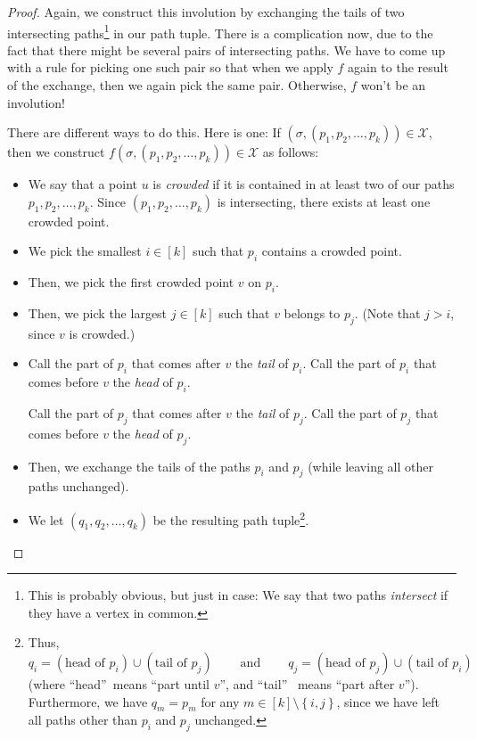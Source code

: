 \begin{definition}
\begin{proof}
Again, we construct this involution by exchanging the tails of two
intersecting paths\footnote{This is probably obvious, but just in case: We say
that two paths \emph{intersect} if they have a vertex in common.} in our path
tuple. There is a complication now, due to the fact that there might be
several pairs of intersecting paths. We have to come up with a rule for
picking one such pair so that when we apply $f$ again to the result of the
exchange, then we again pick the same pair. Otherwise, $f$ won't be an involution!

There are different ways to do this. Here is one: If $\left(  \sigma,\left(
p_{1},p_{2},\ldots,p_{k}\right)  \right)  \in\mathcal{X}$, then we construct
$f\left(  \sigma,\left(  p_{1},p_{2},\ldots,p_{k}\right)  \right)
\in\mathcal{X}$ as follows:

\begin{itemize}
\item We say that a point $u$ is \emph{crowded} if it is contained in at least
two of our paths $p_{1},p_{2},\ldots,p_{k}$. Since $\left(  p_{1},p_{2}%
,\ldots,p_{k}\right)  $ is intersecting, there exists at least one crowded point.

\item We pick the smallest $i\in\left[  k\right]  $ such that $p_{i}$ contains
a crowded point.

\item Then, we pick the first crowded point $v$ on $p_{i}$.

\item Then, we pick the largest $j\in\left[  k\right]  $ such that $v$ belongs
to $p_{j}$. (Note that $j>i$, since $v$ is crowded.)

\item Call the part of $p_{i}$ that comes after $v$ the \emph{tail} of $p_{i}%
$. Call the part of $p_{i}$ that comes before $v$ the \emph{head}\textbf{ }of
$p_{i}$.

Call the part of $p_{j}$ that comes after $v$ the \emph{tail} of $p_{j}$. Call
the part of $p_{j}$ that comes before $v$ the \emph{head}\textbf{ }of $p_{j}$.

\item Then, we exchange the tails of the paths $p_{i}$ and $p_{j}$ (while
leaving all other paths unchanged).

\item We let $\left(  q_{1},q_{2},\ldots,q_{k}\right)  $ be the resulting path
tuple\footnote{Thus,%
\[
q_{i}=\left(  \text{head of }p_{i}\right)  \cup\left(  \text{tail of }%
p_{j}\right)  \ \ \ \ \ \ \ \ \ \ \text{and}\ \ \ \ \ \ \ \ \ \ q_{j}=\left(
\text{head of }p_{j}\right)  \cup\left(  \text{tail of }p_{i}\right)
\]
(where \textquotedblleft head\textquotedblright\ means \textquotedblleft part
until $v$\textquotedblright, and \textquotedblleft tail\textquotedblright%
\ means \textquotedblleft part after $v$\textquotedblright). Furthermore, we
have $q_{m}=p_{m}$ for any $m\in\left[  k\right]  \setminus\left\{
i,j\right\}  $, since we have left all paths other than $p_{i}$ and $p_{j}$
unchanged.}.


\end{itemize}
\end{proof}
\end{definition}
